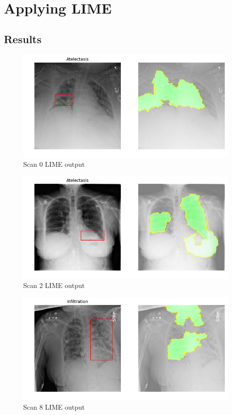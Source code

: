 \section{Applying LIME}


\subsection{Results}
\begin{figure}[H]
\centering
\caption{Scan 0 LIME output}
\includegraphics[width=12cm]{chapters/03_classification/images/lime_0.png}
\end{figure}

\begin{figure}[H]
\centering
\caption{Scan 2 LIME output}
\includegraphics[width=12cm]{chapters/03_classification/images/lime_2.png}
\end{figure}

\begin{figure}[H]
\centering
\caption{Scan 8 LIME output}
\includegraphics[width=12cm]{chapters/03_classification/images/lime_8.png}
\end{figure}

